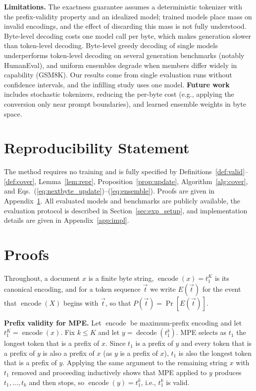 \documentclass{article} %
\newcommand{\encf}{\operatorname{encode}}
\newcommand{\decf}{\operatorname{decode}}
\begin{document}
\textbf{Limitations.} The exactness guarantee assumes a deterministic tokenizer with the prefix-validity property and an idealized model; trained models place mass on invalid encodings, and the effect of discarding this mass is not fully understood. Byte-level decoding costs one model call per byte, which makes generation slower than token-level decoding. Byte-level greedy decoding of single models underperforms token-level decoding on several generation benchmarks (notably HumanEval), and uniform ensembles degrade when members differ widely in capability (GSM8K). Our results come from single evaluation runs without confidence intervals, and the infilling study uses one model. \textbf{Future work} includes stochastic tokenizers, reducing the per-byte cost (e.g., applying the conversion only near prompt boundaries), and learned ensemble weights in byte space.

\section*{Reproducibility Statement}
The method requires no training and is fully specified by Definitions~\ref{def:valid}--\ref{def:cover}, Lemma~\ref{lem:repr}, Proposition~\ref{prop:update}, Algorithm~\ref{alg:cover}, and Eqs.~(\ref{eq:nextbyte_update})--(\ref{eq:ensemble}). Proofs are given in Appendix~\ref{app:proofs}. All evaluated models and benchmarks are publicly available, the evaluation protocol is described in Section~\ref{sec:exp_setup}, and implementation details are given in Appendix~\ref{app:impl}.




\appendix
\section{Proofs}
\label{app:proofs}

Throughout, a document $x$ is a finite byte string, $\encf(x)=t_1^{K}$ is its canonical encoding, and for a token sequence $\vec{t}$ we write $E(\vec{t})$ for the event that $\encf(X)$ begins with $\vec{t}$, so that $P(\vec{t})=\Pr[E(\vec{t})]$.

\textbf{Prefix validity for MPE.} Let $\encf$ be maximum-prefix encoding and let $t_1^K=\encf(x)$. Fix $k\le K$ and let $y=\decf(t_1^k)$. MPE selects as $t_1$ the longest token that is a prefix of $x$. Since $t_1$ is a prefix of $y$ and every token that is a prefix of $y$ is also a prefix of $x$ (as $y$ is a prefix of $x$), $t_1$ is also the longest token that is a prefix of $y$. Applying the same argument to the remaining string $x$ with $t_1$ removed and proceeding inductively shows that MPE applied to $y$ produces $t_1,\ldots,t_k$ and then stops, so $\encf(y)=t_1^k$, i.e., $t_1^k$ is valid.
\end{document}
